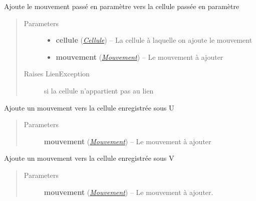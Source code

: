 \documentclass[letterpaper,10pt,english]{sphinxmanual}
\begin{document}
\begin{fulllineitems}
\begin{fulllineitems}
\label{index:Lien.Lien.ajouterMouvementVersCellule}
Ajoute le mouvement passé en paramètre vers la cellule passée en paramètre
\begin{quote}\begin{description}
\item[{Parameters}] \leavevmode\begin{itemize}
\item {} 
\textbf{cellule} ({\hyperref[index:module-Cellule]{\emph{Cellule}}}) -- La cellule à laquelle on ajoute le mouvement

\item {} 
\textbf{mouvement} ({\hyperref[index:module-Mouvement]{\emph{Mouvement}}}) -- Le mouvement à ajouter

\end{itemize}

\item[{Raises LienException}] \leavevmode
si la cellule n'appartient pas au lien

\end{description}\end{quote}

\end{fulllineitems}


\begin{fulllineitems}
\label{index:Lien.Lien.ajouterMouvementVersU}
Ajoute un mouvement vers la cellule enregistrée sous U
\begin{quote}\begin{description}
\item[{Parameters}] \leavevmode
\textbf{mouvement} ({\hyperref[index:module-Mouvement]{\emph{Mouvement}}}) -- Le mouvement à ajouter

\end{description}\end{quote}

\end{fulllineitems}


\begin{fulllineitems}
\label{index:Lien.Lien.ajouterMouvementVersV}
Ajoute un mouvement vers la cellule enregistrée sous V
\begin{quote}\begin{description}
\item[{Parameters}] \leavevmode
\textbf{mouvement} ({\hyperref[index:module-Mouvement]{\emph{Mouvement}}}) -- Le mouvement à ajouter.


\end{description}
\end{quote}
\end{fulllineitems}
\end{fulllineitems}
\end{document}
